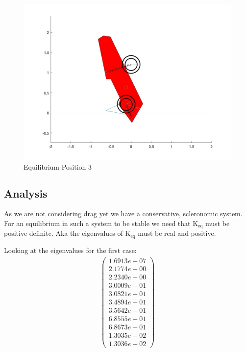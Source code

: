 \begin{figure}[ht]
    \centering
    \includegraphics[scale=0.235]{images/Equilibrium3.jpg}
    \caption{Equilibrium Position 3}
    \label{fig:eq_3}
\end{figure}

\subsection{Analysis}
As we are not considering drag yet we have a conservative, scleronomic system. For an equilibrium in such a system to be stable we need that $\text{K}_{\text{eq}}$ must be positive definite. Aka the eigenvalues of $\text{K}_{\text{eq}}$ must be real and positive.

Looking at the eigenvalues for the first case:
\begin{equation}\label{eq:normal_eigenfrequencies}
    \begin{split}
        \begin{pmatrix}
            1.6913e-07\\
            2.1774e+00\\
            2.2340e+00\\
            3.0009e+01\\
            3.0821e+01\\
            3.4894e+01\\
            3.5642e+01\\
            6.8555e+01\\
            6.8673e+01\\
            1.3035e+02\\
            1.3036e+02
        \end{pmatrix}
    \end{split}
\end{equation}

